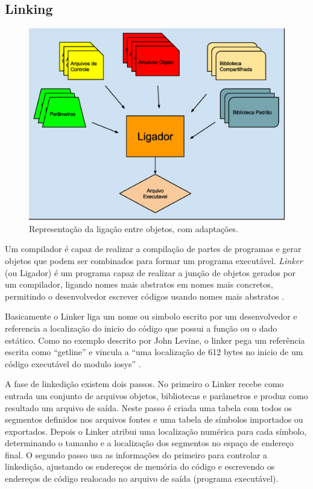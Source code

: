 \subsection{Linking}


\begin{figure}[h]
    \centering
    \label{fig03}
        \includegraphics[keepaspectratio=true,scale=0.5]{figuras/ligador.eps}
    \caption{ Representação da ligação entre objetos, com adaptações\cite{ref37}.}
\end{figure}

Um compilador é capaz de realizar a compilação de partes de programas e gerar
 objetos que podem ser combinados para formar um programa executável. 
\textit{Linker} (ou Ligador) é um programa capaz de realizar a junção 
de objetos gerados por um compilador, ligando nomes mais abstratos em nomes
 mais concretos, permitindo o desenvolvedor escrever códigos usando nomes 
mais abstratos \cite{ref36}.


 Basicamente o Linker liga um nome ou simbolo escrito por um desenvolvedor e
 referencia a localização do inicio do código que possui a função ou o dado
 estático. Como no exemplo descrito por John Levine, o linker pega um 
referência escrita como “getline”  e vincula a “uma localização de 612 bytes 
no inicio de um código executável do modulo iosys” \cite{ref36}. 

A fase de linkedição existem dois passos. No primeiro o Linker recebe como 
entrada um conjunto de arquivos objetos, bibliotecas e parâmetros e produz
 como resultado um arquivo de saída. Neste passo é criada uma tabela com 
todos os segmentos definidos nos arquivos fontes e uma tabela de símbolos 
importados ou exportados. Depois o Linker atribui uma localização numérica 
para cada símbolo, determinando o tamanho e a localização dos segmentos no
 espaço de endereço final. O segundo passo usa as informações do primeiro
 para controlar a linkedição, ajustando os endereços de memória do código e
 escrevendo os endereços de código realocado no arquivo de saída
 (programa executável).


